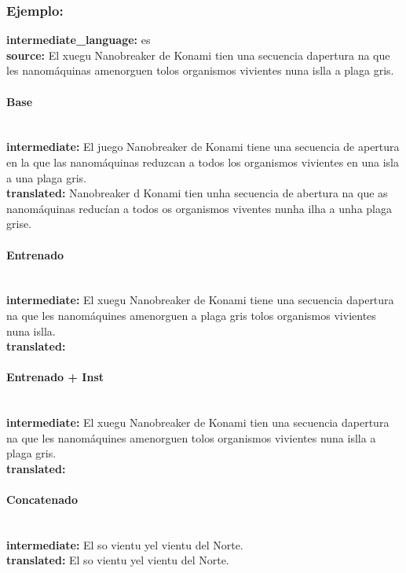 \subsubsection{Ejemplo:}
\textbf{intermediate\_language:} es\\
\textbf{source:} El xuegu Nanobreaker de Konami tien una secuencia d\textquotesingle{}apertura na que les nanomáquinas amenorguen tolos organismos vivientes nuna islla a plaga gris.\\

\paragraph{Base}~\\
\textbf{intermediate:} El juego Nanobreaker de Konami tiene una secuencia de apertura en la que las nanomáquinas reduzcan a todos los organismos vivientes en una isla a una plaga gris.\\
\textbf{translated:} Nanobreaker d Konami tien unha secuencia de abertura na que as nanomáquinas reducían a todos os organismos viventes nunha ilha a unha plaga grise.\\

\paragraph{Entrenado}~\\
\textbf{intermediate:} El xuegu Nanobreaker de Konami tiene una secuencia d\textquotesingle{}apertura na que les nanomáquines amenorguen a plaga gris tolos organismos vivientes nuna islla.\\
\textbf{translated:} \\

\paragraph{Entrenado + Inst}~\\
\textbf{intermediate:} El xuegu Nanobreaker de Konami tien una secuencia d\textquotesingle{}apertura na que les nanomáquines amenorguen tolos organismos vivientes nuna islla a plaga gris.\\
\textbf{translated:} \\

\paragraph{Concatenado}~\\
\textbf{intermediate:} El so vientu ye\textquotesingle{}l vientu del Norte.\\
\textbf{translated:} El so vientu ye\textquotesingle{}l vientu del Norte.\\

